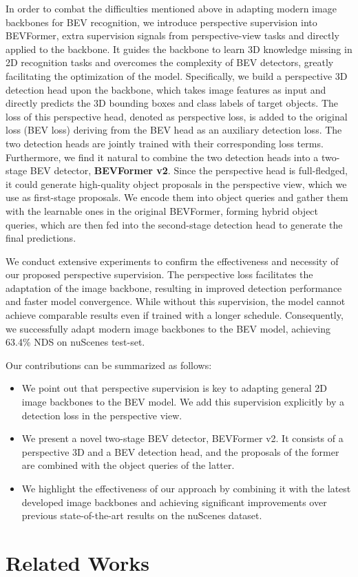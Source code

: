 \documentclass[10pt,twocolumn,letterpaper]{article}
\begin{document}
In order to combat the difficulties mentioned above in adapting modern image backbones for BEV recognition, we introduce perspective supervision into BEVFormer, \ie extra supervision signals from perspective-view tasks and directly applied to the backbone. 
It guides the backbone to learn 3D knowledge missing in 2D recognition tasks and overcomes the complexity of BEV detectors, greatly facilitating the optimization of the model.
Specifically, we build a perspective 3D detection head \cite{DD3D} upon the backbone, which takes image features as input and directly predicts the 3D bounding boxes and class labels of target objects. 
The loss of this perspective head, denoted as perspective loss, is added to the original loss (BEV loss) deriving from the BEV head as an auxiliary detection loss. 
The two detection heads are jointly trained with their corresponding loss terms. 
Furthermore, we find it natural to combine the two detection heads into a two-stage BEV detector,  \textbf{BEVFormer v2}. 
Since the perspective head is full-fledged, it could generate high-quality object proposals in the perspective view, which we use as first-stage proposals. 
We encode them into object queries and gather them with the learnable ones in the original BEVFormer, forming hybrid object queries, which are then fed into the second-stage detection head to generate the final predictions.

We conduct extensive experiments to confirm the effectiveness and necessity of our proposed perspective supervision. 
The perspective loss facilitates the adaptation of the image backbone, resulting in improved detection performance and faster model convergence. 
While without this supervision, the model cannot achieve comparable results even if trained with a longer schedule. 
Consequently, we successfully adapt modern image backbones to the BEV model, achieving  63.4\% NDS on nuScenes \cite{nuscenes} test-set.  

Our contributions can be summarized as follows:
 \begin{itemize}
     \item We point out that perspective supervision is key to adapting general 2D image backbones to the BEV model. We add this supervision explicitly by a detection loss in the perspective view. 
     \item We present a novel two-stage BEV detector, BEVFormer v2. It consists of a perspective 3D and a BEV detection head, and the proposals of the former are combined with the object queries of the latter.
     \item We highlight the effectiveness of our approach by combining it with the latest developed image backbones and achieving significant improvements over previous state-of-the-art results on the nuScenes dataset.
 \end{itemize} \section{Related Works}
\end{document}
